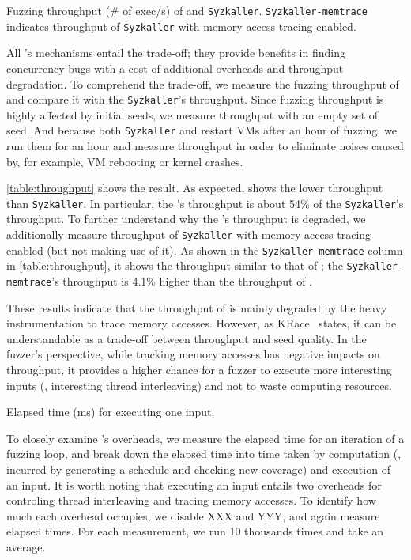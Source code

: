 \dr{}


%
\begin{table}[t]
  \small
  \centering
  
  \caption{Fuzzing throughput (\# of exec/s) of \sys and
    \texttt{Syzkaller}. \texttt{Syzkaller-memtrace} indicates
    throughput of \texttt{Syzkaller} with memory access tracing
    enabled.}
  \label{table:throughput}
\end{table}
%
All \sys's mechanisms entail the trade-off; they provide benefits in
finding concurrency bugs with a cost of additional overheads and
throughput degradation.
%
To comprehend the trade-off, we measure the fuzzing throughput of \sys
and compare it with the \texttt{Syzkaller}'s throughput.
%
Since fuzzing throughput is highly affected by initial seeds, we
measure throughput with an empty set of seed. And because both
\texttt{Syzkaller} and \sys restart VMs after an hour of fuzzing, we
run them for an hour and measure throughput in order to eliminate
noises caused by, for example, VM rebooting or kernel crashes.

\autoref{table:throughput} shows the result. As expected, \sys shows
the lower throughput than \texttt{Syzkaller}. In particular, the
\sys's throughput is about 54\% of the \texttt{Syzkaller}'s
throughput.
%
To further understand why the \sys's throughput is degraded, we
additionally measure throughput of \texttt{Syzkaller} with memory
access tracing enabled (but not making use of it).
%
As shown in the \texttt{Syzkaller-memtrace} column in
\autoref{table:throughput}, it shows the throughput similar to that of
\sys; the \texttt{Syzkaller-memtrace}'s throughput is 4.1\% higher
than the throughput of \sys.

These results indicate that the throughput of \sys is mainly degraded
by the heavy instrumentation to trace memory accesses.
%
However, as KRace~\cite{krace} states, it can be understandable as a
trade-off between throughput and seed quality.
%
In the fuzzer's perspective, while tracking memory accesses has
negative impacts on throughput, it provides a higher chance for a
fuzzer to execute more interesting inputs (\ie, interesting thread
interleaving) and not to waste computing resources.




%
\begin{table}[t]
  \centering
  
  \caption{ Elapsed time (ms) for executing one input.}
  \label{table:elapsedtime}
\end{table}
%
%
To closely examine \sys's overheads, we measure the elapsed time for
an iteration of a fuzzing loop, and break down the elapsed time into
time taken by computation (\ie, incurred by generating a schedule and
checking new coverage) and execution of an input.
%
It is worth noting that executing an input entails two overheads for
controling thread interleaving and tracing memory accesses. To
identify how much each overhead occupies, we disable XXX and YYY, and
again measure elapsed times.
%
For each measurement, we run 10 thousands times and take an average.

